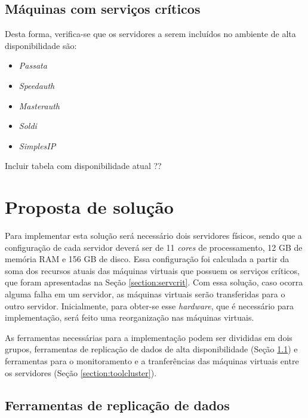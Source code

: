 \subsection{Máquinas com serviços críticos}
\label{section:maqservcrit}

Desta forma, verifica-se que os servidores a serem incluídos no ambiente de alta disponibilidade são:
\begin{itemize}
 \item \textit{Passata}
 \item \textit{Speedauth}
 \item \textit{Masterauth}
 \item \textit{Soldi}
 \item \textit{SimplesIP}
\end{itemize}

Incluir tabela com disponibilidade atual ??


\section{Proposta de solução}
\label{section:propostasolucao}

Para implementar esta solução será necessário dois servidores físicos, sendo que a configuração de cada servidor deverá ser de 
11 \textit{cores} de processamento, 12 GB de memória \ac{RAM} e 156 GB de disco. Essa configuração foi calculada a partir da soma dos recursos 
atuais das máquinas virtuais que possuem os serviços críticos, que foram apresentadas na Seção \ref{section:servcrit}.
Com essa solução, caso ocorra alguma falha em um servidor, as máquinas virtuais serão transferidas para o outro servidor.
Inicialmente, para obter-se esse \textit{hardware}, que é necessário para implementação, será feito uma reorganização nas máquinas virtuais.

As ferramentas necessárias para a implementação podem ser divididas em dois grupos, ferramentas de replicação de dados de alta disponibilidade
(Seção \ref{section:toolrepl}) e ferramentas para o monitoramento e a tranferências das máquinas virtuais entre os servidores 
(Seção \ref{section:toolcluster}).

\subsection{Ferramentas de replicação de dados}
\label{section:toolrepl}

